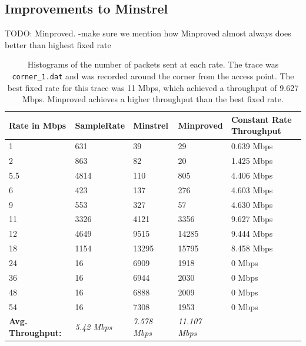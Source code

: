 \documentclass[letterpaper,twocolumn,10pt]{article}
\begin{document}
\subsection{Improvements to Minstrel}
TODO: Minproved.
-make sure we mention how Minproved almost always does better than highest fixed rate
\begin{table}[htb]
    \centering
    \begin{tabular}{l|l|l|l|l}
    \textbf{Rate in Mbps}     & \textbf{SampleRate} & \textbf{Minstrel}   & \textbf{Minproved}   & \textbf{Constant Rate Throughput}\\ \hline
    1                & 631        & 39         & 29      & 0.639 Mbps    \\
    2                & 863        & 82         & 20      & 1.425 Mbps    \\
    5.5              & 4814       & 110        & 805     & 4.406 Mbps    \\
    6                & 423       & 137        & 276     & 4.603 Mbps    \\
    9                & 553         & 327        & 57      & 4.630 Mbps   \\
    11               & 3326       & 4121       & 3356    & 9.627 Mbps   \\
    12               & 4649       & 9515       & 14285   & 9.444 Mbps   \\
    18               & 1154         & 13295      & 15795   & 8.458 Mbps    \\
    24               & 16         & 6909       & 1918    & 0 Mbps   \\
    36               & 16         & 6944       & 2030    & 0 Mbps   \\
    48               & 16         & 6888       & 2009    & 0 Mbps   \\
    54               & 16         & 7308       & 1953    & 0 Mbps   \\ \hline
    \textbf{Avg. Throughput:} & \emph{5.42 Mbps}  & \emph{7.578 Mbps} & \emph{11.107 Mbps} \\
    \end{tabular}
    \caption{Histograms of the number of packets sent at each rate.  The trace was \texttt{corner\_1.dat} and was recorded around the corner from the access point. The best fixed rate for this trace was 11 Mbps, which achieved a throughput of 9.627 Mbps. Minproved achieves a higher throughput than the best fixed rate.}
\label{table:2}
\end{table}
\end{document}
